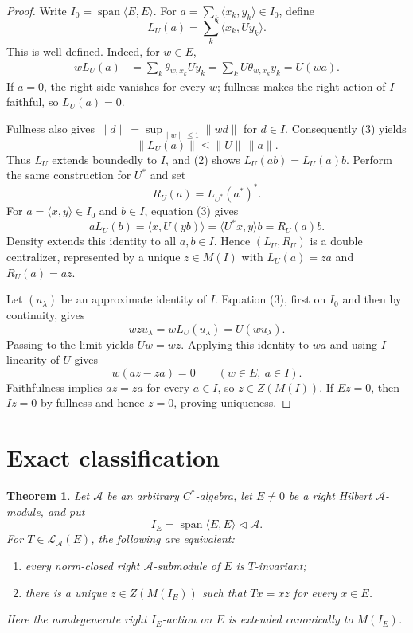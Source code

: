 \documentclass[11pt]{article}
\newtheorem{theorem}{Theorem}
\newcommand{\A}{\mathcal A}
\newcommand{\Icoeff}{I_E}
\newcommand{\Ladj}{\mathcal L}
\newcommand{\spn}{\operatorname{span}}
\begin{document}
\begin{proof}
Write $I_0=\spn\langle E,E\rangle$.  For
$a=\sum_k\langle x_k,y_k\rangle\in I_0$, define
\[
             L_U(a)=\sum_k\langle x_k,Uy_k\rangle.       \tag{2}
\]
This is well-defined.  Indeed, for $w\in E$,
\begin{align*}
 wL_U(a)
 &=\sum_k\theta_{w,x_k}Uy_k
  =\sum_k U\theta_{w,x_k}y_k
  =U(wa).
                                                               \tag{3}
\end{align*}
If $a=0$, the right side vanishes for every $w$; fullness makes the right
action of $I$ faithful, so $L_U(a)=0$.

Fullness also gives
$\|d\|=\sup_{\|w\|\le1}\|wd\|$ for $d\in I$.  Consequently (3) yields
\[
       \|L_U(a)\|\le \|U\|\,\|a\|.
\]
Thus $L_U$ extends boundedly to $I$, and (2) shows
$L_U(ab)=L_U(a)b$.  Perform the same construction for $U^*$ and set
\[
              R_U(a)=L_{U^*}(a^*)^*.
\]
For $a=\langle x,y\rangle\in I_0$ and $b\in I$, equation (3) gives
\[
 aL_U(b)=\langle x,U(yb)\rangle
        =\langle U^*x,y\rangle b
        =R_U(a)b.
\]
Density extends this identity to all $a,b\in I$.  Hence $(L_U,R_U)$ is a
double centralizer, represented by a unique $z\in M(I)$ with
$L_U(a)=za$ and $R_U(a)=az$.

Let $(u_\lambda)$ be an approximate identity of $I$.  Equation (3), first on
$I_0$ and then by continuity, gives
\[
 wzu_\lambda=wL_U(u_\lambda)=U(wu_\lambda).
\]
Passing to the limit yields $Uw=wz$.  Applying this identity to $wa$ and
using $I$-linearity of $U$ gives
\[
             w(az-za)=0\qquad(w\in E,\ a\in I).
\]
Faithfulness implies $az=za$ for every $a\in I$, so $z\in Z(M(I))$.
If $Ez=0$, then $Iz=0$ by fullness and hence $z=0$, proving uniqueness.
\end{proof}

\section{Exact classification}

\begin{theorem}\label{thm:main}
Let $\A$ be an arbitrary $C^*$-algebra, let $E\ne0$ be a right Hilbert
$\A$-module, and put
\[
            \Icoeff=\overline{\spn}\langle E,E\rangle\triangleleft\A.
\]
For $T\in\Ladj_\A(E)$, the following are equivalent:
\begin{enumerate}
 \item every norm-closed right $\A$-submodule of $E$ is $T$-invariant;
 \item there is a unique $z\in Z(M(\Icoeff))$ such that
       $Tx=xz$ for every $x\in E$.
\end{enumerate}
Here the nondegenerate right $\Icoeff$-action on $E$ is extended canonically
to $M(\Icoeff)$.
\end{theorem}
\end{document}
